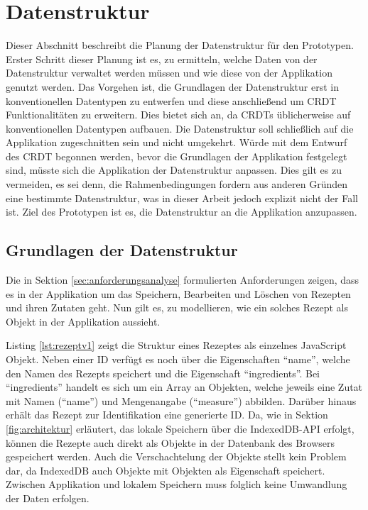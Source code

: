 \documentclass[a4paper, 12pt]{scrreprt}
\begin{document}
\section{Datenstruktur}
\label{sec:Datenstruktur}

Dieser Abschnitt beschreibt die Planung der Datenstruktur für den Prototypen. Erster Schritt dieser Planung ist es, zu ermitteln, welche Daten von der Datenstruktur verwaltet werden müssen und wie diese von der Applikation genutzt werden. Das Vorgehen ist, die Grundlagen der Datenstruktur erst in konventionellen Datentypen zu entwerfen und diese anschließend um CRDT Funktionalitäten zu erweitern. Dies bietet sich an, da \acp{CRDT} üblicherweise auf konventionellen Datentypen aufbauen. Die Datenstruktur soll schließlich auf die Applikation zugeschnitten sein und nicht umgekehrt. Würde mit dem Entwurf des CRDT begonnen werden, bevor die Grundlagen der Applikation festgelegt sind, müsste sich die Applikation der Datenstruktur anpassen. Dies gilt es zu vermeiden, es sei denn, die Rahmenbedingungen fordern aus anderen Gründen eine bestimmte Datenstruktur, was in dieser Arbeit jedoch explizit nicht der Fall ist. Ziel des Prototypen ist es, die Datenstruktur an die Applikation anzupassen. 

\subsection{Grundlagen der Datenstruktur}

Die in Sektion \ref{sec:anforderungsanalyse} formulierten Anforderungen zeigen, dass es in der Applikation um das Speichern, Bearbeiten und Löschen von Rezepten und ihren Zutaten geht. Nun gilt es, zu modellieren, wie ein solches Rezept als Objekt in der Applikation aussieht. 

Listing \ref{lst:rezeptv1} zeigt die Struktur eines Rezeptes als einzelnes JavaScript Objekt. Neben einer ID verfügt es noch über die Eigenschaften \enquote{name}, welche den Namen des Rezepts speichert und die Eigenschaft \enquote{ingredients}. Bei \enquote{ingredients} handelt es sich um ein Array an Objekten, welche jeweils eine Zutat mit Namen (\enquote{name}) und Mengenangabe (\enquote{measure}) abbilden. Darüber hinaus erhält das Rezept zur Identifikation eine generierte ID. Da, wie in Sektion \ref{fig:architektur} erläutert, das lokale Speichern über die IndexedDB-API erfolgt, können die Rezepte auch direkt als Objekte in der Datenbank des Browsers gespeichert werden. Auch die Verschachtelung der Objekte stellt kein Problem dar, da IndexedDB auch Objekte mit Objekten als Eigenschaft speichert. Zwischen Applikation und lokalem Speichern muss folglich keine Umwandlung der Daten erfolgen.
\end{document}

